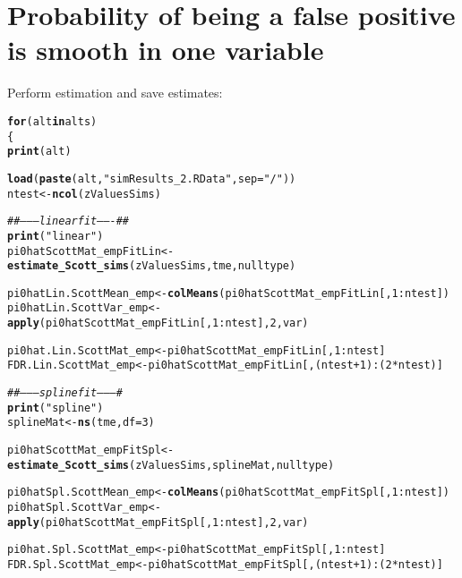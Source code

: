 \documentclass{article}\usepackage[]{graphicx}\usepackage[]{color}
\makeatletter
\newcommand{\hlnum}[1]{\textcolor[rgb]{0.686,0.059,0.569}{#1}}%
\newcommand{\hlstr}[1]{\textcolor[rgb]{0.192,0.494,0.8}{#1}}%
\newcommand{\hlcom}[1]{\textcolor[rgb]{0.678,0.584,0.686}{\textit{#1}}}%
\newcommand{\hlopt}[1]{\textcolor[rgb]{0,0,0}{#1}}%
\newcommand{\hlstd}[1]{\textcolor[rgb]{0.345,0.345,0.345}{#1}}%
\newcommand{\hlkwa}[1]{\textcolor[rgb]{0.161,0.373,0.58}{\textbf{#1}}}%
\newcommand{\hlkwb}[1]{\textcolor[rgb]{0.69,0.353,0.396}{#1}}%
\newcommand{\hlkwc}[1]{\textcolor[rgb]{0.333,0.667,0.333}{#1}}%
\newcommand{\hlkwd}[1]{\textcolor[rgb]{0.737,0.353,0.396}{\textbf{#1}}}%
\newenvironment{kframe}{%
 \def\at@end@of@kframe{}%
 \ifinner\ifhmode%
  \def\at@end@of@kframe{\end{minipage}}%
  \begin{minipage}{\columnwidth}%
 \fi\fi%
 \def\FrameCommand##1{\hskip\@totalleftmargin \hskip-\fboxsep
 \colorbox{shadecolor}{##1}\hskip-\fboxsep
     \hskip-\linewidth \hskip-\@totalleftmargin \hskip\columnwidth}%
 \MakeFramed {\advance\hsize-\width
   \@totalleftmargin\z@ \linewidth\hsize
   \@setminipage}}%
 {\par\unskip\endMakeFramed%
 \at@end@of@kframe}
\newenvironment{knitrout}{}{} %
\makeatother
\begin{document}
\section{Probability of being a false positive is smooth in one variable}

Perform estimation and save estimates:

\begin{knitrout}
\color{fgcolor}\begin{kframe}
\begin{alltt}
\hlkwa{for}\hlstd{(alt} \hlkwa{in} \hlstd{alts)}
\hlstd{\{}
  \hlkwd{print}\hlstd{(alt)}

  \hlkwd{load}\hlstd{(}\hlkwd{paste}\hlstd{(alt,}\hlstr{"simResults_2.RData"}\hlstd{,}\hlkwc{sep}\hlstd{=}\hlstr{"/"}\hlstd{))}
  \hlstd{ntest} \hlkwb{<-} \hlkwd{ncol}\hlstd{(zValuesSims)}

  \hlcom{##--------linear fit-------##}
  \hlkwd{print}\hlstd{(}\hlstr{"linear"}\hlstd{)}
  \hlstd{pi0hatScottMat_empFitLin} \hlkwb{<-} \hlkwd{estimate_Scott_sims}\hlstd{(zValuesSims, tme, nulltype)}

  \hlstd{pi0hatLin.ScottMean_emp} \hlkwb{<-} \hlkwd{colMeans}\hlstd{(pi0hatScottMat_empFitLin[,}\hlnum{1}\hlopt{:}\hlstd{ntest])}
  \hlstd{pi0hatLin.ScottVar_emp} \hlkwb{<-} \hlkwd{apply}\hlstd{(pi0hatScottMat_empFitLin[,}\hlnum{1}\hlopt{:}\hlstd{ntest],}\hlnum{2}\hlstd{,var)}

  \hlstd{pi0hat.Lin.ScottMat_emp} \hlkwb{<-} \hlstd{pi0hatScottMat_empFitLin[,}\hlnum{1}\hlopt{:}\hlstd{ntest]}
  \hlstd{FDR.Lin.ScottMat_emp} \hlkwb{<-} \hlstd{pi0hatScottMat_empFitLin[,(ntest}\hlopt{+}\hlnum{1}\hlstd{)}\hlopt{:}\hlstd{(}\hlnum{2}\hlopt{*}\hlstd{ntest)]}

  \hlcom{##---------spline fit---------#}
  \hlkwd{print}\hlstd{(}\hlstr{"spline"}\hlstd{)}
  \hlstd{splineMat} \hlkwb{<-} \hlkwd{ns}\hlstd{(tme,}\hlkwc{df}\hlstd{=}\hlnum{3}\hlstd{)}

  \hlstd{pi0hatScottMat_empFitSpl} \hlkwb{<-} \hlkwd{estimate_Scott_sims}\hlstd{(zValuesSims, splineMat, nulltype)}

  \hlstd{pi0hatSpl.ScottMean_emp} \hlkwb{<-} \hlkwd{colMeans}\hlstd{(pi0hatScottMat_empFitSpl[,}\hlnum{1}\hlopt{:}\hlstd{ntest])}
  \hlstd{pi0hatSpl.ScottVar_emp} \hlkwb{<-} \hlkwd{apply}\hlstd{(pi0hatScottMat_empFitSpl[,}\hlnum{1}\hlopt{:}\hlstd{ntest],}\hlnum{2}\hlstd{,var)}

  \hlstd{pi0hat.Spl.ScottMat_emp} \hlkwb{<-} \hlstd{pi0hatScottMat_empFitSpl[,}\hlnum{1}\hlopt{:}\hlstd{ntest]}
  \hlstd{FDR.Spl.ScottMat_emp} \hlkwb{<-} \hlstd{pi0hatScottMat_empFitSpl[,(ntest}\hlopt{+}\hlnum{1}\hlstd{)}\hlopt{:}\hlstd{(}\hlnum{2}\hlopt{*}\hlstd{ntest)]}


\end{alltt}
\end{kframe}
\end{knitrout}
\end{document}
